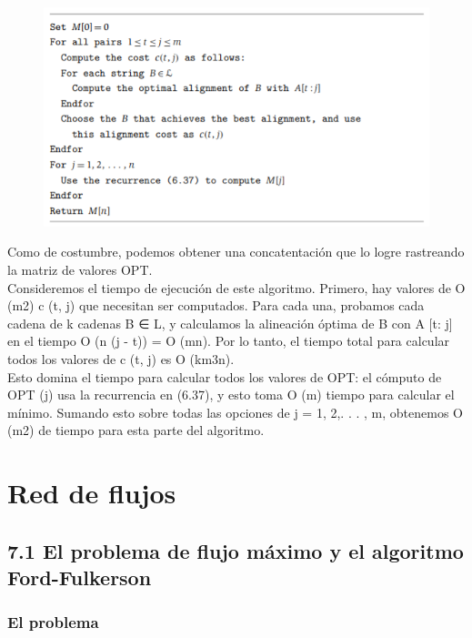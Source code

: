 \documentclass[a4paper]{article}
\begin{document}
\begin{figure}[h]
\centering
\includegraphics[scale=1]{Imagenes-Seccion6/cod6_19.PNG}
\end{figure}

Como de costumbre, podemos obtener una concatentación que lo logre rastreando la matriz de valores OPT.\\

Consideremos el tiempo de ejecución de este algoritmo. Primero, hay valores de O (m2) c (t, j) que necesitan ser computados. Para cada una, probamos cada cadena de k cadenas B ∈ L, y calculamos la alineación óptima de B con A [t: j] en el tiempo O (n (j - t)) = O (mn). Por lo tanto, el tiempo total para calcular todos los valores de c (t, j) es O (km3n).\\

Esto domina el tiempo para calcular todos los valores de OPT: el cómputo de OPT (j) usa la recurrencia en (6.37), y esto toma O (m) tiempo para calcular el mínimo. Sumando esto sobre todas las opciones de j = 1, 2,. . . , m, obtenemos O (m2) de tiempo para esta parte del algoritmo.\\


\newpage

\section{Red de flujos}

\subsection{7.1 El problema de flujo máximo y el algoritmo Ford-Fulkerson}

\subsubsection*{El problema}
\end{document}
